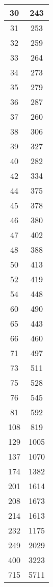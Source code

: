 \begin{table}
\begin{tabular}{|c|c|}
    30     & 243 \\
    \hline
    31     & 253 \\
    \hline
    32     & 259 \\
    \hline
    33     & 264 \\
    \hline
    34     & 273 \\
    \hline
    35     & 279 \\
    \hline
    36     & 287 \\
    \hline
    37     & 260 \\
    \hline
    38     & 306 \\
    \hline
    39     & 327 \\
    \hline
    40     & 282 \\
    \hline
    42     & 334 \\
    \hline
    44     & 375 \\
    \hline
    45     & 378 \\
    \hline
    46     & 380 \\
    \hline
    47     & 402 \\
    \hline
    48     & 388 \\
    \hline
    50     & 413 \\
    \hline
    52     & 419 \\
    \hline
    54     & 448 \\
    \hline
    60     & 490 \\
    \hline
    65     & 443 \\
    \hline
    66     & 460 \\
    \hline
    71     & 497 \\
    \hline
    73     & 511 \\
    \hline
    75     & 528 \\
    \hline
    76     & 545 \\
    \hline
    81     & 592 \\
    \hline
    108    & 819 \\
    \hline
    129    & 1005 \\
    \hline
    137    & 1070 \\
    \hline
    174    & 1382 \\
    \hline
    201    & 1614 \\
    \hline
    208    & 1673 \\
    \hline
    214    & 1613 \\
    \hline
    232    & 1175 \\
    \hline
    249    & 2029 \\
    \hline
    400    & 3223 \\
    \hline
    715    & 5711 \\
    \hline
  \end{tabular}
  \caption{}
  \label{tbl:}
\end{table}
